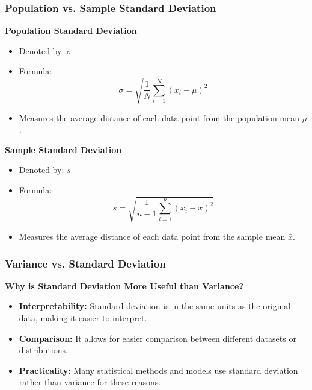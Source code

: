 \documentclass[handout]{beamer} %
\begin{document}
\begin{frame}
\frametitle{Population vs. Sample Standard Deviation}

\begin{minipage}{0.48\textwidth}
\centering
\textbf{Population Standard Deviation}
\begin{itemize}
    \item Denoted by: $\sigma$
    \item Formula:
    \begin{equation*}
    \sigma = \sqrt{\frac{1}{N} \sum_{i=1}^{N} (x_i - \mu)^2}
    \end{equation*}
    \item Measures the average distance of each data point from the population mean $\mu$.
\end{itemize}
\end{minipage}
\hfill
\begin{minipage}{0.48\textwidth}
\centering
\textbf{Sample Standard Deviation}
\begin{itemize}
    \item Denoted by: $s$
    \item Formula:
    \begin{equation*}
    s = \sqrt{\frac{1}{n-1} \sum_{i=1}^{n} (x_i - \bar{x})^2}
    \end{equation*}
    \item Measures the average distance of each data point from the sample mean $\bar{x}$.
\end{itemize}
\end{minipage}
\end{frame}

\begin{frame}
\frametitle{Variance vs. Standard Deviation}
 \textbf{Why is Standard Deviation More Useful than Variance?}
    \begin{itemize}
        \item \textbf{Interpretability:} Standard deviation is in the same units as the original data, making it easier to interpret.
        \item \textbf{Comparison:} It allows for easier comparison between different datasets or distributions.
        \item \textbf{Practicality:} Many statistical methods and models use standard deviation rather than variance for these reasons.
    \end{itemize}
\end{frame}
\end{document}
